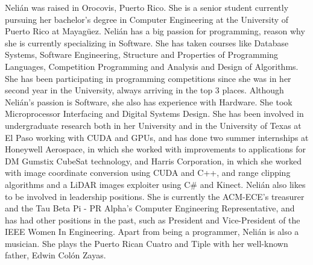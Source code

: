 \label{sec:bios}


Nelián was raised in Orocovis, Puerto Rico. She is a senior
student currently pursuing her bachelor's degree in Computer Engineering at the
University of Puerto Rico at Mayagüez. Nelián has a big passion for programming,
reason why she is currently specializing in Software. She has taken courses like
Database Systems, Software Engineering, Structure and Properties of  Programming
Languages, Competition Programming and Analysis and  Design of Algorithms. She
has been participating in programming competitions  since she was in her second
year in the University, always arriving in the top  3 places. Although Nelián's
passion is Software, she also has experience  with Hardware. She took
Microprocessor Interfacing and Digital Systems Design.  She has been involved in
undergraduate research both in her University  and in the University of Texas at
El Paso working with CUDA and GPUs,  and has done two summer internships at
Honeywell Aerospace, in which she worked  with improvements to applications for
DM Gumstix CubeSat technology,  and Harris Corporation, in which she worked with
image coordinate conversion  using CUDA and C++, and range clipping algorithms
and a LiDAR images exploiter  using C\# and Kinect. Nelián also likes to be
involved in leadership positions.  She is currently the ACM-ECE's treasurer and
the Tau Beta Pi - PR Alpha's  Computer Engineering Representative, and has had
other positions in the past, such as President and Vice-President of the IEEE
Women In Engineering. Apart from being  a programmer, Nelián is also a musician.
She plays the Puerto Rican Cuatro and Tiple  with her well-known father, Edwin
Colón Zayas.


